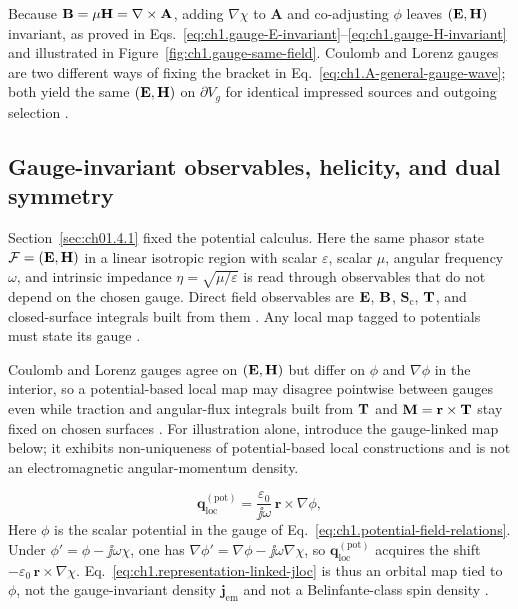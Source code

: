 Because $\mathbf{B}=\mu\mathbf{H}=\nabla\times\mathbf{A}$, adding $\nabla\chi$ to $\mathbf{A}$ and co-adjusting $\phi$ leaves $(\mathbf{E},\mathbf{H})$ invariant, as proved in Eqs.~\eqref{eq:ch1.gauge-E-invariant}--\eqref{eq:ch1.gauge-H-invariant} and illustrated in Figure~\ref{fig:ch1.gauge-same-field}. Coulomb and Lorenz gauges are two different ways of fixing the bracket in Eq.~\eqref{eq:ch1.A-general-gauge-wave}; both yield the same $(\mathbf{E},\mathbf{H})$ on $\partial V_g$ for identical impressed sources and outgoing selection \cite{stratton1941}.

\subsection{Gauge-invariant observables, helicity, and dual symmetry}
\label{sec:ch01.4.3}

Section~\ref{sec:ch01.4.1} fixed the potential calculus. Here the same phasor state $\mathcal{F}=(\mathbf{E},\mathbf{H})$ in a linear isotropic region with scalar $\varepsilon$, scalar $\mu$, angular frequency $\omega$, and intrinsic impedance $\eta=\sqrt{\mu/\varepsilon}$ is read through observables that do not depend on the chosen gauge. Direct field observables are $\mathbf{E}$, $\mathbf{B}$, $\mathbf{S}_\mathrm{c}$, $\mathbf{T}$, and closed-surface integrals built from them \cite{maxwell1873,belinfante1940}. \label{eq:ch1.gauge-observable-invariance}\label{eq:ch1.observable-admissibility-triad}\label{eq:ch1.observable-charge-continuous-triad}
Any local map tagged to potentials must state its gauge \cite{belinfante1940}.

Coulomb and Lorenz gauges agree on $(\mathbf{E},\mathbf{H})$ but differ on $\phi$ and $\nabla\phi$ in the interior, so a potential-based local map may disagree pointwise between gauges even while traction and angular-flux integrals built from $\mathbf{T}$ and $\mathbf{M}=\mathbf{r}\times\mathbf{T}$ stay fixed on chosen surfaces \cite{belinfante1940,maxwell1873}. For illustration alone, introduce the gauge-linked map below; it exhibits non-uniqueness of potential-based local constructions and is not an electromagnetic angular-momentum density.


\begin{equation}
\label{eq:ch1.representation-linked-jloc}
\mathbf{q}_{\mathrm{loc}}^{(\mathrm{pot})}
=
\frac{\varepsilon_0}{\jj\omega}\,\mathbf{r}\times\nabla\phi,
\end{equation}
Here $\phi$ is the scalar potential in the gauge of Eq.~\eqref{eq:ch1.potential-field-relations}. Under $\phi'=\phi-\jj\omega\chi$, one has $\nabla\phi'=\nabla\phi-\jj\omega\nabla\chi$, so $\mathbf{q}_{\mathrm{loc}}^{(\mathrm{pot})}$ acquires the shift $-\varepsilon_0\,\mathbf{r}\times\nabla\chi$. Eq.~\eqref{eq:ch1.representation-linked-jloc} is thus an orbital map tied to $\phi$, not the gauge-invariant density $\mathbf{j}_{\mathrm{em}}$ and not a Belinfante-class spin density \cite{belinfante1940,stratton1941}.

